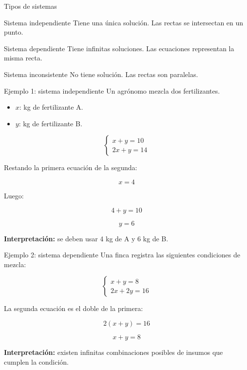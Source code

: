 \documentclass{beamer}
\begin{document}
	\begin{frame}{Tipos de sistemas}
		\begin{block}{Sistema independiente}
			Tiene una única solución.  
			Las rectas se intersectan en un punto.
		\end{block}
		
		\begin{block}{Sistema dependiente}
			Tiene infinitas soluciones.  
			Las ecuaciones representan la misma recta.
		\end{block}
		
		\begin{block}{Sistema inconsistente}
			No tiene solución.  
			Las rectas son paralelas.
		\end{block}
	\end{frame}
	
	\begin{frame}{Ejemplo 1: sistema independiente}
		Un agrónomo mezcla dos fertilizantes.
		
		\begin{itemize}
			\item $x$: kg de fertilizante A.
			\item $y$: kg de fertilizante B.
		\end{itemize}
		
		\[
		\begin{cases}
			x + y = 10 \\
			2x + y = 14
		\end{cases}
		\]
		
		Restando la primera ecuación de la segunda:
		
		\[
		x = 4
		\]
		
		Luego:
		
		\[
		4 + y = 10
		\]
		
		\[
		y = 6
		\]
		
		\bigskip
		
		\textbf{Interpretación:} se deben usar 4 kg de A y 6 kg de B.
	\end{frame}
	
	\begin{frame}{Ejemplo 2: sistema dependiente}
		Una finca registra las siguientes condiciones de mezcla:
		
		\[
		\begin{cases}
			x + y = 8 \\
			2x + 2y = 16
		\end{cases}
		\]
		
		La segunda ecuación es el doble de la primera:
		
		\[
		2(x+y)=16
		\]
		
		\[
		x+y=8
		\]
		
		\bigskip
		
		\textbf{Interpretación:} existen infinitas combinaciones posibles de insumos que cumplen la condición.
	\end{frame}
	
\end{document}
